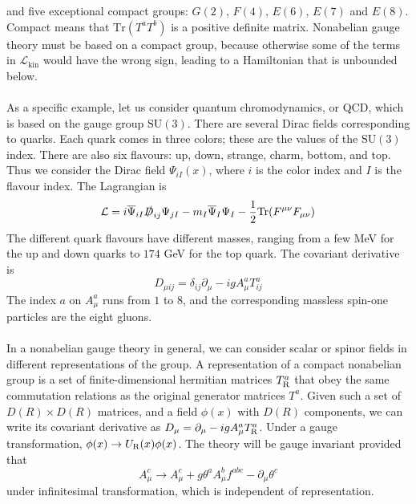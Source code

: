 and five exceptional compact groups: $G(2)$, $F(4)$, $E(6)$, $E(7)$ and $E(8)$. Compact means that $\mathrm{Tr}(T^aT^b)$ is a positive definite matrix. Nonabelian gauge theory must be based on a compact group, because otherwise some of the
terms in $\mathcal{L}_{\mathrm{kin}}$ would have the wrong sign, leading to a Hamiltonian that is unbounded below.
\\ \\
As a specific example, let us consider quantum chromodynamics, or QCD, which is based on the gauge group $\mathrm{SU}(3)$. There are several Dirac fields corresponding to quarks. Each quark comes in three colors; these are the
values of the $\mathrm{SU}(3)$ index. 
There are also six flavours: up, down, strange, charm, bottom, and top. Thus we consider the Dirac field $\Psi_{iI}(x)$, where $i$ is the color index and $I$ is the flavour index. The Lagrangian is
\[\mathcal{L} = i\overline{\Psi}_{iI}\slashed{D}_{ij}\Psi_{jI} - m_I\overline{\Psi}_{I}\Psi_{I} - \frac{1}{2}\mathrm{Tr}(F^{\mu\nu}F_{\mu\nu})\]
The different quark flavours have different masses, ranging from a few MeV for the up and down quarks to $174$ GeV for the top quark. The covariant derivative is
\[D_{\mu ij} = \delta_{ij}\partial_{\mu} - igA^a_{\mu}T^a_{ij}\]
The index $a$ on $A^a_{\mu}$ runs from $1$ to $8$, and the corresponding massless spin-one particles are the eight gluons.
\\ \\
In a nonabelian gauge theory in general, we can consider scalar or spinor fields in different representations of the group. A representation of a compact nonabelian group is a set of finite-dimensional hermitian matrices $T^a_{\rm R}$ that obey the same commutation relations as the original generator matrices $T^a$. 
Given such a set of $D(R)\times D(R)$ matrices, and
a field $\phi(x)$ with $D(R)$ components, we can write its covariant derivative as $D_{\mu} = \partial_{\mu} -igA^a_{\mu}T^a_{\rm R}$. 
Under a gauge transformation, $\phi(x) \to U_{\rm R}(x)\phi(x)$. The theory will be gauge invariant provided that
\[A^c_{\mu} \to A^c_{\mu} + g\theta^aA^b_{\mu}f^{abc} - \partial_{\mu}\theta^c\]
under infinitesimal transformation, which is independent of representation.

